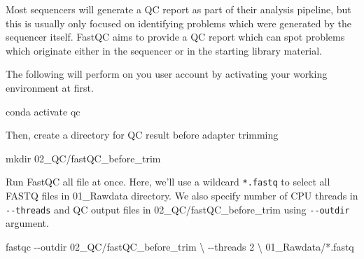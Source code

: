 \documentclass[
  letterpaper,
  DIV=11,
  numbers=noendperiod]{scrreprt}
\newenvironment{Shaded}{\begin{snugshade}}{\end{snugshade}}
\newcommand{\AttributeTok}[1]{\textcolor[rgb]{0.40,0.45,0.13}{#1}}
\newcommand{\DataTypeTok}[1]{\textcolor[rgb]{0.68,0.00,0.00}{#1}}
\newcommand{\ExtensionTok}[1]{\textcolor[rgb]{0.00,0.23,0.31}{#1}}
\newcommand{\FunctionTok}[1]{\textcolor[rgb]{0.28,0.35,0.67}{#1}}
\newcommand{\NormalTok}[1]{\textcolor[rgb]{0.00,0.23,0.31}{#1}}
\newcommand{\PreprocessorTok}[1]{\textcolor[rgb]{0.68,0.00,0.00}{#1}}
\begin{document}
Most sequencers will generate a QC report as part of their analysis
pipeline, but this is usually only focused on identifying problems which
were generated by the sequencer itself. FastQC aims to provide a QC
report which can spot problems which originate either in the sequencer
or in the starting library material.

\begin{tcolorbox}[enhanced jigsaw, breakable, bottomrule=.15mm, left=2mm, coltitle=black, opacityback=0, colframe=quarto-callout-note-color-frame, toprule=.15mm, opacitybacktitle=0.6, colbacktitle=quarto-callout-note-color!10!white, bottomtitle=1mm, colback=white, toptitle=1mm, titlerule=0mm, rightrule=.15mm, arc=.35mm, title=\textcolor{quarto-callout-note-color}{\faInfo}\hspace{0.5em}{Activity}, leftrule=.75mm]

The following will perform on you user account by activating your
working environment at first.

\begin{Shaded}
\begin{Highlighting}[]
\ExtensionTok{conda}\NormalTok{ activate qc}
\end{Highlighting}
\end{Shaded}

Then, create a directory for QC result before adapter trimming

\begin{Shaded}
\begin{Highlighting}[]
\FunctionTok{mkdir}\NormalTok{ 02\_QC/fastQC\_before\_trim}
\end{Highlighting}
\end{Shaded}

Run FastQC all file at once. Here, we'll use a wildcard \texttt{*.fastq}
to select all FASTQ files in 01\_Rawdata directory. We also specify
number of CPU threads in \texttt{-\/-threads} and QC output files in
02\_QC/fastQC\_before\_trim using \texttt{-\/-outdir} argument.

\begin{Shaded}
\begin{Highlighting}[]
\ExtensionTok{fastqc} \AttributeTok{{-}{-}outdir}\NormalTok{ 02\_QC/fastQC\_before\_trim }\DataTypeTok{\textbackslash{}}
\NormalTok{{-}{-}threads 2 }\DataTypeTok{\textbackslash{}}
\NormalTok{01\_Rawdata/}\PreprocessorTok{*}\NormalTok{.fastq}
\end{Highlighting}
\end{Shaded}

\end{tcolorbox}
\end{document}

